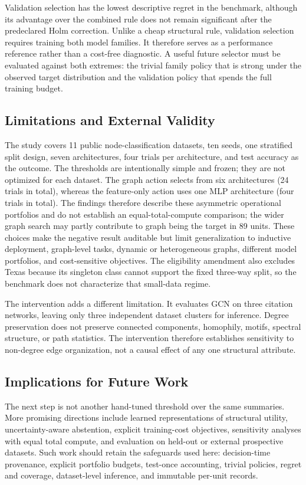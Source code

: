 Validation selection has the lowest descriptive regret in the benchmark, although its advantage over the combined rule does not remain significant after the predeclared Holm correction. Unlike a cheap structural rule, validation selection requires training both model families. It therefore serves as a performance reference rather than a cost-free diagnostic. A useful future selector must be evaluated against both extremes: the trivial family policy that is strong under the observed target distribution and the validation policy that spends the full training budget.

\subsection{Limitations and External Validity}

The study covers 11 public node-classification datasets, ten seeds, one stratified split design, seven architectures, four trials per architecture, and test accuracy as the outcome. The thresholds are intentionally simple and frozen; they are not optimized for each dataset. The graph action selects from six architectures (24 trials in total), whereas the feature-only action uses one MLP architecture (four trials in total). The findings therefore describe these asymmetric operational portfolios and do not establish an equal-total-compute comparison; the wider graph search may partly contribute to graph being the target in 89 units. These choices make the negative result auditable but limit generalization to inductive deployment, graph-level tasks, dynamic or heterogeneous graphs, different model portfolios, and cost-sensitive objectives. The eligibility amendment also excludes Texas because its singleton class cannot support the fixed three-way split, so the benchmark does not characterize that small-data regime.

The intervention adds a different limitation. It evaluates GCN on three citation networks, leaving only three independent dataset clusters for inference. Degree preservation does not preserve connected components, homophily, motifs, spectral structure, or path statistics. The intervention therefore establishes sensitivity to non-degree edge organization, not a causal effect of any one structural attribute.

\subsection{Implications for Future Work}

The next step is not another hand-tuned threshold over the same summaries. More promising directions include learned representations of structural utility, uncertainty-aware abstention, explicit training-cost objectives, sensitivity analyses with equal total compute, and evaluation on held-out or external prospective datasets. Such work should retain the safeguards used here: decision-time provenance, explicit portfolio budgets, test-once accounting, trivial policies, regret and coverage, dataset-level inference, and immutable per-unit records.
